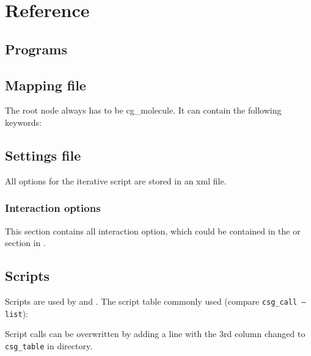 \chapter{Reference}
\section{Programs}
\label{sec:ref_programs}

\section{Mapping file}
\label{sec:ref_mapping}
The root node always has to be cg\_molecule. It can contain the following keywords:



\section{Settings file}
All options for the iterative script are stored in an xml file.
\label{sec:ref_options}


\subsection{Interaction options}
\label{sec:ref_interaction}
This section contains all interaction option, which could be contained in the  or  section in .

\vfill

\section{Scripts}
\label{sec:csg_table}
Scripts are used by  and .
The script table commonly used (compare \texttt{csg\_call --list}): 

Script calls can be overwritten by adding a line with the 3rd column changed to \texttt{csg\_table} in  directory.

